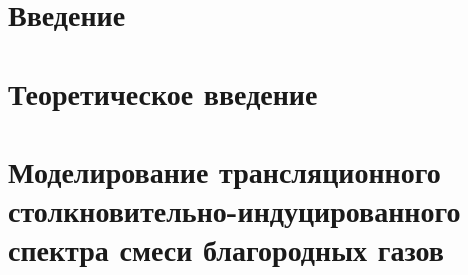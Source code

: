 \documentclass[12pt]{book}
\begin{document}
\tableofcontents

\chapter{Введение}


\chapter{Теоретическое введение}


\chapter{Моделирование трансляционного столкновительно-индуцированного спектра смеси благородных газов}


%



\end{document}
